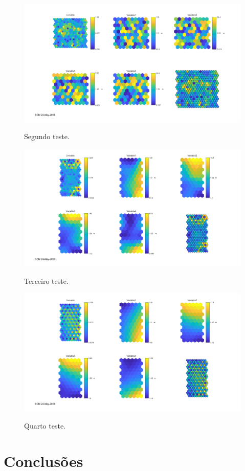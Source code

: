 \documentclass[journal, a4paper]{IEEEtran}
\begin{document}
\begin{figure}
	\centering
	\includegraphics[scale=0.5]{Images/SOM2.png}
	\label{SOM2}
	\caption{Segundo teste.}
\end{figure}

\begin{figure}
	\centering
	\includegraphics[scale=0.5]{Images/SOM3.png}
	\label{SOM3}
	\caption{Terceiro teste.}
\end{figure}

\begin{figure}
	\centering
	\includegraphics[scale=0.5]{Images/SOM4.png}
	\label{SOM4}
	\caption{Quarto teste.}
\end{figure}

\section{Conclusões}










\end{document}
